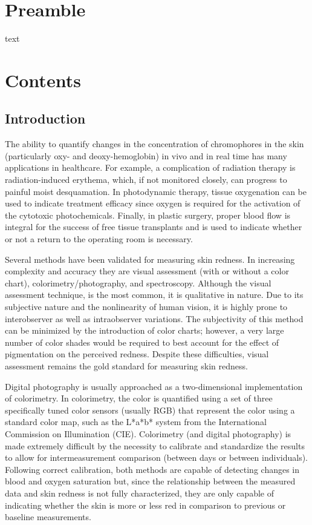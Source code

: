 \section{Preamble}
text

\section{Contents}
\subsection{Introduction}
The ability to quantify changes in the concentration of chromophores in the skin (particularly oxy- and deoxy-hemoglobin) in vivo and in real time has many applications in healthcare. For example, a complication of radiation therapy is radiation-induced erythema, which, if not monitored closely, can progress to painful moist desquamation.\cite{Hopewell1990,Russell1994,Nystrom2004,Fitzgerald2008} In photodynamic therapy, tissue oxygenation can be used to indicate treatment efficacy\cite{Woodhams2007} since oxygen is required for the activation of the cytotoxic photochemicals.\cite{Patterson1989a,Wilson2008} Finally, in plastic surgery, proper blood flow is integral for the success of free tissue transplants and is used to indicate whether or not a return to the operating room is necessary.\cite{Steele2011}

Several methods have been validated for measuring skin redness. In increasing complexity and accuracy they are visual assessment (with or without a color chart), colorimetry/photography, and spectroscopy.\cite{Agache2004} Although the visual assessment technique,\cite{Trotti2003} is the most common, it is qualitative in nature. Due to its subjective nature and the nonlinearity of human vision, it is highly prone to interobserver as well as intraobserver variations.\cite{Bodekaer2013} The subjectivity of this method can be minimized by the introduction of color charts; however, a very large number of color shades would be required to best account for the effect of pigmentation on the perceived redness. Despite these difficulties, visual assessment remains the gold standard for measuring skin redness.\cite{Basketter1997,Wengstrom2004}

Digital photography is usually approached as a two-dimensional implementation of colorimetry. In colorimetry, the color is quantified using a set of three specifically tuned color sensors (usually RGB) that represent the color using a standard color map, such as the L*a*b* system from the International Commission on Illumination (CIE).\cite{CI2012} Colorimetry (and digital photography) is made extremely difficult by the necessity to calibrate and standardize the results to allow for intermeasurement comparison (between days or between individuals).\cite{Jung2012} Following correct calibration, both methods are capable of detecting changes in blood and oxygen saturation but, since the relationship between the measured data and skin redness is not fully characterized, they are only capable of indicating whether the skin is more or less red in comparison to previous or baseline measurements.\cite{Kollias2002,Canning2009,Nishidate2011,Setaro2002}

